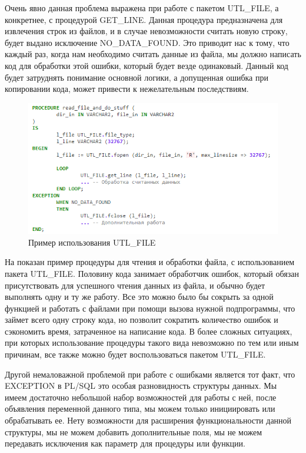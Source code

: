 Очень явно данная проблема выражена при работе с пакетом UTL\_FILE\cite{utl-file}, а конкретнее, с процедурой GET\_LINE. Данная процедура предназначена для извлечения строк из файлов, и в случае невозможности считать новую строку, будет выдано исключение NO\_DATA\_FOUND. Это приводит нас к тому, что каждый раз, когда нам необходимо считать данные из файла, мы должно написать код для обработки этой ошибки, который будет везде одинаковый. Данный код будет затруднять понимание основной логики, а допущенная ошибка при копировании кода, может привести к нежелательным последствиям. 

\begin{figure}[ht!] 
	\center
	\includegraphics [scale=1] {my_folder/img/C1_utl_file_problem}
	\caption{Пример использования UTL\_FILE} 
	\label{fig:C1_utl_file_problem}  
\end{figure}
\FloatBarrier

На  показан пример процедуры для чтения и обработки файла, с использованием пакета UTL\_FILE. Половину кода занимает обработчик ошибок, который обязан присутствовать для успешного чтения данных из файла, и обычно будет выполнять одну и ту же работу. Все это можно было бы сокрыть за одной функцией и работать с файлами при помощи вызова нужной подпрограммы, что займет всего одну строку кода, но позволит сократить количество ошибок и сэкономить время, затраченное на написание кода. В более сложных ситуациях, при которых использование процедуры такого вида невозможно по тем или иным причинам, все также можно будет воспользоваться пакетом UTL\_FILE.

Другой немаловажной проблемой при работе с ошибками является тот факт, что EXCEPTION в PL/SQL это особая разновидность структуры данных. Мы имеем достаточно небольшой набор возможностей для работы с ней, после объявления переменной данного типа, мы можем только инициировать или обрабатывать ее. Нету возможности для расширения функциональности данной структуры, мы не можем добавить дополнительные поля, мы не можем передавать исключения как параметр для процедуры или функции.

